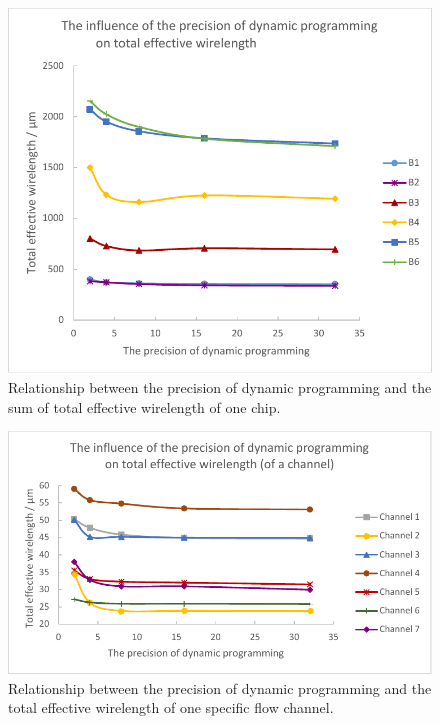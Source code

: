 \documentclass[journal]{IEEEtran}
\begin{document}
\begin{figure}
	\label{fig:pcsc}
	\centering
	\includegraphics[width=0.95\columnwidth, angle=0]{./Figs/precision_case.pdf}
	\vspace{-0.2cm}
	\caption{Relationship between the precision of dynamic programming and the sum of total effective wirelength of one chip.}
	\label{fig:pcsc}
\end{figure}

\begin{figure}
	\label{fig:pcs}
	\centering
	\includegraphics[width=0.95\columnwidth, angle=0]{./Figs/precision.pdf}
	\vspace{-0.2cm}
	\caption{Relationship between the precision of dynamic programming and the total effective wirelength of one specific flow channel.}
	\label{fig:pcs}
\end{figure}
\end{document}
